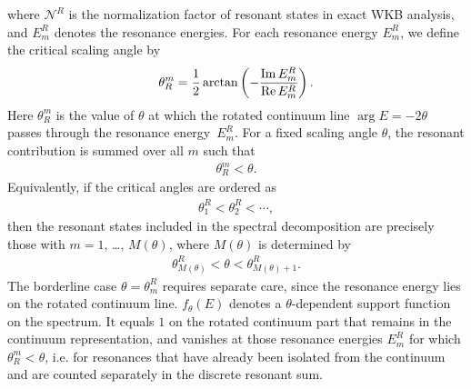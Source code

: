 where $\mathcal{N}^R$ is the normalization factor of resonant states in exact WKB analysis, and $E_m^R$ denotes the resonance energies. For each resonance energy $E_m^R$, we define the critical scaling angle by
\begin{align}
    \theta_R^m
    =
    \frac{1}{2}
    \arctan\left(
        -\frac{\operatorname{Im} E_m^R}{\operatorname{Re} E_m^R}
    \right) .
\end{align}
Here $\theta_R^m$ is the value of $\theta$ at which the rotated continuum line $\arg E=-2\theta$ passes through the resonance energy~$E_m^R$.
For a fixed scaling angle $\theta$, the resonant contribution is summed over all $m$ such that
\begin{align}
    \theta_R^m < \theta .
\end{align}
Equivalently, if the critical angles are ordered as
\begin{align}
    \theta_1^R < \theta_2^R < \cdots ,
\end{align}
then the resonant states included in the spectral decomposition are precisely those with $m=1$, \dots, $M(\theta)$, where $M(\theta)$ is determined by
\begin{align}
    \theta_{M(\theta)}^R < \theta < \theta_{M(\theta)+1}^R .
\end{align}
The borderline case $\theta=\theta_m^R$ requires separate care, since the resonance energy lies on the rotated continuum line.
$f_\theta(E)$ denotes a $\theta$-dependent support function on the spectrum. It equals $1$ on the rotated continuum part that remains in the continuum representation, and vanishes at those resonance energies $E_m^R$ for which $\theta_R^m<\theta$, i.e. for resonances that have already been isolated from the continuum and are counted separately in the discrete resonant sum.
